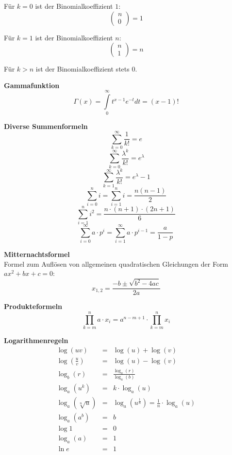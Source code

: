 \documentclass[10pt,a4paper,twocolumn]{article}
\begin{document}
Für $k=0$ ist der Binomialkoeffizient $1$:
\[
\left(
\begin{array}{c}
	n \\
	0
\end{array}
\right)=1
\]

Für $k=1$ ist der Binomialkoeffizient $n$:
\[
\left(
\begin{array}{c}
	n \\
	1
\end{array}
\right)=n
\]

Für $k>n$ ist der Binomialkoeffizient stets $0$.

\vspace{10pt}

\textbf{Gammafunktion}
\[
\Gamma(x) = \int\limits_{0}^{\infty}t^{x-1}e^{-t}dt=(x-1)!
\]

\vspace{10pt}

\textbf{Diverse Summenformeln}
\[
\sum\limits_{k=0}^{\infty}\frac{1}{k!}=e
\]
\[
\sum\limits_{k=0}^{\infty}\frac{\lambda^k}{k!}=e^{\lambda}
\]
\[
\sum\limits_{k=1}^{\infty}\frac{\lambda^k}{k!}=e^{\lambda}-1
\]
\[
\sum\limits_{i=0}^{n}i=\sum\limits_{i=1}^{n}i=\frac{n(n-1)}{2}
\]
\[
\sum\limits_{i=1}^{n}i^2=\frac{n\cdot (n+1)\cdot (2n+1)}{6}
\]
\[
\sum\limits_{i=0}^{\infty}a\cdot p^i=\sum\limits_{i=1}^{\infty}a\cdot p^{i-1}=\frac{a}{1-p}
\]

\vspace{10pt}

\textbf{Mitternachtsformel} \\
Formel zum Auflösen von allgemeinen quadratischen Gleichungen der Form $ax^2+bx+c=0$:
\[
x_{1,2} = \frac{-b\pm\sqrt{b^2-4ac}}{2a} 
\]

\textbf{Produkteformeln}
\[
\prod\limits_{k=m}^{n}a\cdot x_i = a^{n-m+1}\cdot\prod\limits_{k=m}^{n}x_i
\]

\vspace{10pt}

\textbf{Logarithmenregeln}
\[
\begin{array}{rcl}
	\log{(uv)} & = & \log{(u)}+\log{(v)} \\
	\log{(\frac{u}{v})} & = & \log{(u)}-\log{(v)} \\
	\log_b{(r)} & = & \frac{\log_a(r)}{\log_a{(b)}} \\
	\log_a{(u^k)} & = & k\cdot\log_a{(u)} \\
	\log_a{(\sqrt[n]{u})} & = & \log_a{(u^{\frac{1}{n}})}=\frac{1}{n}\cdot\log_a{(u)} \\
	\log_a{(a^b)} & = & b \\ 
	\log{1} & = & 0 \\
	\log_a{(a)} & = & 1 \\	
	\ln{e} & = & 1 \\
		
\end{array}
\]
\end{document}
